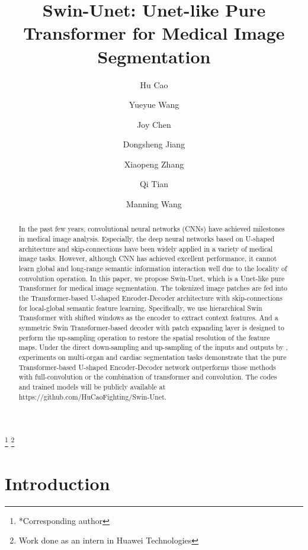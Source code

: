 \documentclass[runningheads]{llncs}
\begin{document}
\title{Swin-Unet: Unet-like Pure Transformer for Medical Image Segmentation
}
\author{Hu Cao\inst{1\dagger} \and 
Yueyue Wang\inst{2\dagger} \and
Joy Chen \and
Dongsheng Jiang
\and
Xiaopeng Zhang
\and
Qi Tian
\and
Manning Wang
}




\maketitle              


\begin{abstract}
In the past few years, convolutional neural networks (CNNs) have achieved milestones in medical image analysis. Especially, the deep neural networks based on U-shaped architecture and skip-connections have been widely applied in a variety of medical image tasks. However, although CNN has achieved excellent performance, it cannot learn global and long-range semantic information interaction well due to the locality of convolution operation. In this paper, we propose Swin-Unet, which is a Unet-like pure Transformer for medical image segmentation. The tokenized image patches are fed into the Transformer-based U-shaped Encoder-Decoder architecture with skip-connections for local-global semantic feature learning. Specifically, we use hierarchical Swin Transformer with shifted windows as the encoder to extract context features. And a symmetric Swin Transformer-based decoder with patch expanding layer is designed to perform the up-sampling operation to restore the spatial resolution of the feature maps. Under the direct down-sampling and up-sampling of the inputs and outputs by , experiments on multi-organ and cardiac segmentation tasks demonstrate that the pure Transformer-based U-shaped Encoder-Decoder network outperforms those methods with full-convolution or the combination of transformer and convolution. The codes and trained models will be publicly available at https://github.com/HuCaoFighting/Swin-Unet.
 
\end{abstract}
\footnote{*Corresponding author}
\footnote{ Work done as an intern in Huawei Technologies}

\section{Introduction}
\end{document}

